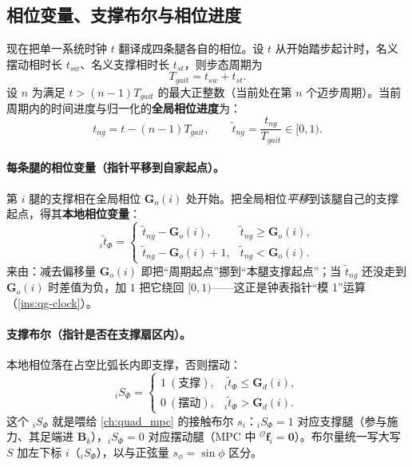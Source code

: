 \subsection{相位变量、支撑布尔与相位进度}
\label{subsec:qg-phase}

现在把单一系统时钟 $t$ 翻译成四条腿各自的相位。设 $t$ 从开始踏步起计时，名义摆动相时长 $t_{sw}$、名义支撑相时长 $t_{st}$，则步态周期为
\begin{equation}
  T_{gait}=t_{sw}+t_{st}.
  \label{eq:qg-period}
\end{equation}
设 $n$ 为满足 $t>(n-1)T_{gait}$ 的最大正整数（当前处在第 $n$ 个迈步周期）。当前周期内的时间进度与归一化的\textbf{全局相位进度}为\cite{yu2021quadruped}：
\begin{equation}
  t_{ng}=t-(n-1)T_{gait},\qquad
  \tilde t_{ng}=\frac{t_{ng}}{T_{gait}}\in[0,1).
  \label{eq:qg-global-phase}
\end{equation}

\paragraph{每条腿的相位变量（指针平移到自家起点）。}
第 $i$ 腿的支撑相在全局相位 $\mathbf{G}_o(i)$ 处开始。把全局相位\emph{平移}到该腿自己的支撑起点，得其\textbf{本地相位变量}\cite{yu2021quadruped}：
\begin{equation}
  {}_i\tilde t_\Phi=
  \begin{cases}
  \tilde t_{ng}-\mathbf{G}_o(i), & \tilde t_{ng}\ge\mathbf{G}_o(i),\\[2pt]
  \tilde t_{ng}-\mathbf{G}_o(i)+1, & \tilde t_{ng}<\mathbf{G}_o(i).
  \end{cases}
  \label{eq:qg-leg-phase}
\end{equation}
来由：减去偏移量 $\mathbf{G}_o(i)$ 即把“周期起点”挪到“本腿支撑起点”；当 $\tilde t_{ng}$ 还没走到 $\mathbf{G}_o(i)$ 时差值为负，加 $1$ 把它绕回 $[0,1)$——这正是钟表指针“模 1”运算（\cref{ins:qg-clock}）。

\paragraph{支撑布尔（指针是否在支撑扇区内）。}
本地相位落在占空比弧长内即支撑，否则摆动\cite{yu2021quadruped}：
\begin{equation}
  {}_iS_\Phi=
  \begin{cases}
  1\ (\text{支撑}), & {}_i\tilde t_\Phi\le\mathbf{G}_d(i),\\
  0\ (\text{摆动}), & {}_i\tilde t_\Phi>\mathbf{G}_d(i).
  \end{cases}
  \label{eq:qg-stance-bool}
\end{equation}
这个 ${}_iS_\Phi$ 就是喂给 \cref{ch:quad_mpc} 的接触布尔 $s_i$：${}_iS_\Phi=1$ 对应支撑腿（参与施力、其足端进 $\mathbf{B}_k$），${}_iS_\Phi=0$ 对应摆动腿（MPC 中 ${}^{\mathcal{O}}\boldsymbol{f}_i=\mathbf{0}$）。布尔量统一写大写 $S$ 加左下标 $i$（${}_iS_\Phi$），以与正弦量 $s_\phi=\sin\phi$ 区分。

